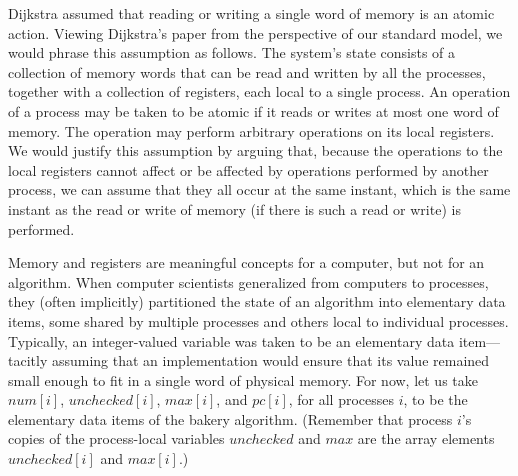 \documentclass[fleqn,leqno]{article}
\begin{document}
Dijkstra assumed that reading or writing a single word of memory is an
atomic action.  Viewing Dijkstra's paper from the perspective of our
standard model, we would phrase this assumption as follows.  The
system's state consists of a collection of memory words that can be
read and written by all the processes, together with a collection of
registers, each local to a single process.  An operation of a process
may be taken to be atomic if it reads or writes at most one word of
memory.  The operation may perform arbitrary operations on its local
registers.  We would justify this assumption by arguing that, because
the operations to the local registers cannot affect or be affected by
operations performed by another process, we can assume that they all
occur at the same instant, which is the same instant as the read or
write of memory (if there is such a read or write) is performed.

Memory and registers are meaningful concepts for a computer, but not
for an algorithm.  When computer scientists generalized from computers
to processes, they (often implicitly) partitioned the state of an
algorithm into elementary 
data items, some shared by multiple
processes and others local to individual processes.  Typically, an
integer-valued variable was taken to be an elementary data
item---tacitly assuming that an implementation would ensure that its
value remained small enough to fit in a single word of physical
memory.  For now, let us take $num[i]$, $unchecked[i]$, $max[i]$, and
$pc[i]$, for all processes $i$, to be the elementary data items of the
bakery algorithm.  (Remember that process $i$'s copies of the
process-local variables $unchecked$ and $max$ are the array elements
$unchecked[i]$ and $max[i]$.)
\end{document}
